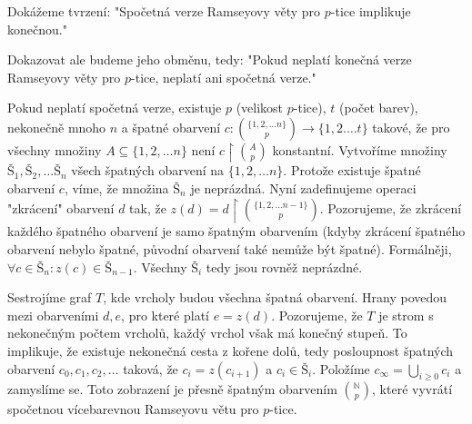 \begin{t_proof}
  Dokážeme tvrzení: "Spočetná verze Ramseyovy věty pro $p$-tice implikuje konečnou."  
  
  Dokazovat ale budeme jeho obměnu, tedy: "Pokud neplatí konečná verze Ramseyovy věty pro $p$-tice, neplatí ani spočetná verze."

  Pokud neplatí spočetná verze, existuje $p$ (velikost $p$-tice), $t$ (počet barev), nekonečně mnoho $n$ a špatné obarvení $c:\binom{\{1,2,\dots n\}}{p}\rightarrow \{1,2.\dots t\}$ takové, že pro všechny množiny $A\subseteq\{1,2,\dots n\}$ není $c\restriction\binom{A}{p}$ konstantní. Vytvoříme množiny $Š_1, Š_2,\dots Š_n$ všech špatných obarvení na $\{1,2,\dots n\}$. Protože existuje špatné obarvení $c$, víme, že množina $Š_n$ je neprázdná. Nyní zadefinujeme operaci "zkrácení" obarvení $d$ tak, že $z(d)=d\restriction\binom{\{1,2,\dots n-1\}}{p}$. Pozorujeme, že zkrácení každého špatného obarvení je samo špatným obarvením (kdyby zkrácení špatného obarvení nebylo špatné, původní obarvení také nemůže být špatné). Formálněji, $\forall c\in Š_n:z(c)\in Š_{n-1}$. Všechny $Š_i$ tedy jsou rovněž neprázdné.

  Sestrojíme graf $T$, kde vrcholy budou všechna špatná obarvení. Hrany povedou mezi obarveními $d,e$, pro které platí $e=z(d)$. Pozorujeme, že $T$ je strom s nekonečným počtem vrcholů, každý vrchol však má konečný stupeň. To implikuje, že existuje nekonečná cesta z kořene dolů, tedy posloupnost špatných obarvení $c_0,c_1,c_2,\dots$ taková, že $c_i=z(c_{i+1})$ a $c_i\in Š_i$. Položíme $c_\infty=\bigcup_{i\geq 0} c_i$ a zamyslíme se. Toto zobrazení je přesně špatným obarvením $\binom{\mathbb{N}}{p}$, které vyvrátí spočetnou vícebarevnou Ramseyovu větu pro $p$-tice.
\end{t_proof}